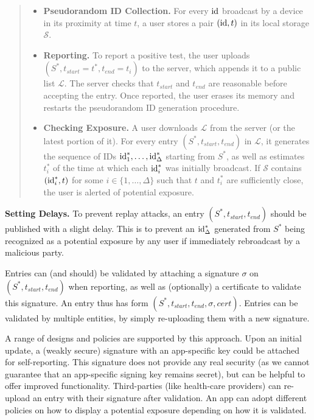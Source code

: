 \documentclass{article}
\begin{document}
\begin{quote}
\begin{itemize}
\item {\bf Pseudorandom ID Collection.} For every $\mathrm{id}$ broadcast by a device in its proximity at time $t$, a user stores a pair $(\mathrm{id}, t)$ in its local storage $\mathcal{S}$.
\item {\bf Reporting.} To report a positive test, the user uploads $(S^*, t_{start}=t^*, t_{end}=t_i)$ to the server, which appends it to a public list $\mathcal{L}$. The server checks that $t_{start}$ and $t_{end}$ are reasonable before accepting the entry. Once reported, the user erases its memory and restarts the pseudorandom ID generation procedure.
\item {\bf Checking Exposure.} A user downloads $\mathcal{L}$ from the server (or the latest portion of it). For every entry $(S^*,t_{start}, t_{end})$ in $\mathcal{L}$, it generates the sequence of IDs $\mathrm{id}^*_1, \ldots, \mathrm{id}^*_{\Delta}$ starting from $S^*$, as well as  estimates $t_i^*$ of the time at which each $\mathrm{id}_i^*$ was initially broadcast. If $\mathcal{S}$ contains $(\mathrm{id}_i^*, t)$ for some $i \in \{1, \ldots, \Delta\}$ such that $t$ and $t_i^*$ are sufficiently close, the user is alerted of potential exposure.
\end{itemize}
\end{quote}
{\bf Setting Delays.} To prevent replay attacks, an entry $(S^*,t_{start}, t_{end})$ should be published with a slight delay. This is to prevent an $\mathrm{id}^*_{\Delta}$ generated from $S^*$ being recognized as a potential exposure by any user if immediately rebroadcast by a malicious party.

 Entries can (and should) be validated by attaching a signature $\sigma$ on $(S^*, t_{start}, t_{end})$ when reporting, as well as (optionally) a certificate to validate this signature. An entry thus has form $(S^*, t_{start}, t_{end}, \sigma, cert)$. Entries can be validated by multiple entities, by simply re-uploading them with a new signature.

A range of designs and policies are supported by this approach. Upon an initial update, a (weakly secure) signature with an app-specific key could be attached for self-reporting. This signature does not provide any real security (as we cannot guarantee that an app-specific signing key remains secret), but can be helpful to offer improved functionality.  
%
Third-parties (like health-care providers) can re-upload an entry with their signature after validation. An app can adopt different policies on how to display a potential exposure depending on how it is validated.
\end{document}
